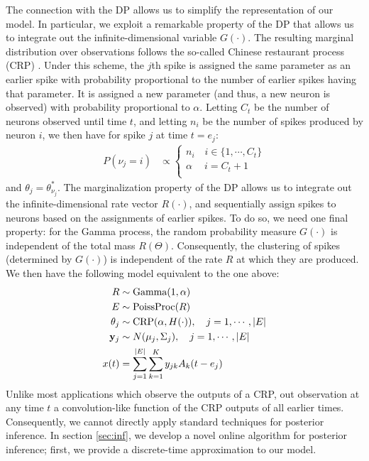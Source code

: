 The connection with the DP allows us to simplify the representation of our model. In particular, we exploit a remarkable property of the DP that
allows us to integrate out the infinite-dimensional variable $G(\cdot)$. The resulting marginal distribution over observations follows the so-called
 Chinese restaurant process (CRP) \citep{Pit2002a}. Under this scheme, the $j$th spike is assigned the same parameter as an earlier spike with probability 
proportional to the number of earlier spikes having that parameter. It is assigned a new parameter (and thus, a new neuron is observed) with probability 
proportional to $\alpha$. Letting $C_t$ be the number of neurons observed until time $t$, and letting $n_i$ be the number of spikes produced by neuron $i$,
we then have for spike $j$ at time $t = e_j$: 
\begin{align}
  P({\nu_j} = i) & \propto 
  \begin{cases}
   n_i \quad i \in \{1,\cdots, C_{t}\} \\
   \alpha \quad\ i = C_{t} + 1 \\
  \end{cases}  
\label{eq:crp_marg_pr}
\end{align}
and $\theta_j = \theta^*_{\nu_j}$. 
The marginalization property of the DP allows us to integrate out the infinite-dimensional rate vector $R(\cdot)$, and sequentially 
assign spikes to neurons based on the assignments of earlier spikes.
To do so, we need one final property: for the Gamma process, the random probability measure $G(\cdot)$ is independent of the total mass $R(\Theta)$. 
Consequently, the clustering of spikes (determined by $G(\cdot)$) is independent of the rate $R$ at which they are produced. We then have
 the following model equivalent to the one above:
\begin{align}
  R & \sim \text{Gamma}(1,\alpha) \\
  E &\sim \text{PoissProc}(R) \\
  \theta_j &\sim \text{CRP}(\alpha, H(\cdot)), \quad j = 1,\cdots, |E|   \label{eq:CRP}\\
  \mathbf{y}_j &\sim N(\mu_{j}, \Sigma_{j}), \quad  j = 1,\cdots, |E|   \label{eq:CRP_mix}\\
  x(t) &=   \sum_{j=1}^{|E|} \sum_{k=1}^K y_{jk} A_k(t - e_{j})
\end{align}
Unlike most applications which observe the outputs of a CRP, out observation at any time $t$ a convolution-like function of the CRP outputs of all
earlier times. Consequently, we cannot directly apply standard techniques for posterior inference. In section \ref{sec:inf}, we develop a novel online 
algorithm for posterior inference; first, we provide a discrete-time approximation to our model.

